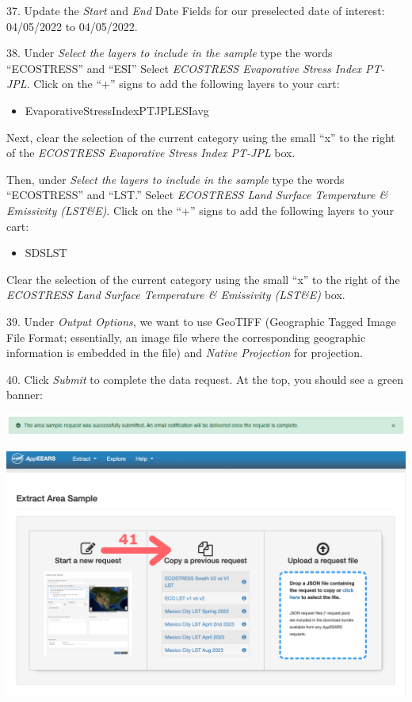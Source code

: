 \documentclass[oneside,a4paper,11pt,explicit]{book}
\begin{document}
37. Update the \textit{Start} and \textit{End} Date Fields for our preselected date of interest: 04/05/2022 to 04/05/2022.

38. Under \textit{Select the layers to include in the sample} type the words ``ECOSTRESS'' and ``ESI'' Select \textit{ECOSTRESS Evaporative Stress Index PT-JPL}. Click on the ``+'' signs to add the following layers to your cart: 

\begin{itemize}
	\item Evaporative\textunderscore Stress\textunderscore Index\textunderscore PT\textunderscore JPL\textunderscore ESIavg
\end{itemize}

Next, clear the selection of the current category using the small ``x'' to the right of the \textit{ECOSTRESS Evaporative Stress Index PT-JPL} box.

Then, under \textit{Select the layers to include in the sample} type the words ``ECOSTRESS'' and ``LST.'' Select \textit{ECOSTRESS Land Surface Temperature \& Emissivity (LST\&E)}. Click on the ``+'' signs to add the following layers to your cart: 

\begin{itemize}
	\item SDS\textunderscore LST
\end{itemize}

Clear the selection of the current category using the small ``x'' to the right of the \textit{ECOSTRESS Land Surface Temperature \& Emissivity (LST\&E)} box.

39. Under \textit{Output Options}, we want to use GeoTIFF (Geographic Tagged Image File Format; essentially, an image file where the corresponding geographic information is embedded in the file) and \textit{Native Projection} for projection.

40. Click \textit{Submit} to complete the data request. At the top, you should see a green banner:

\vspace{.5em}

\centerline{\includegraphics[width=\textwidth]{RequestSuccess.png}}

\centerline{\includegraphics[width=\textwidth]{RepeatRequest.png}}
\end{document}
